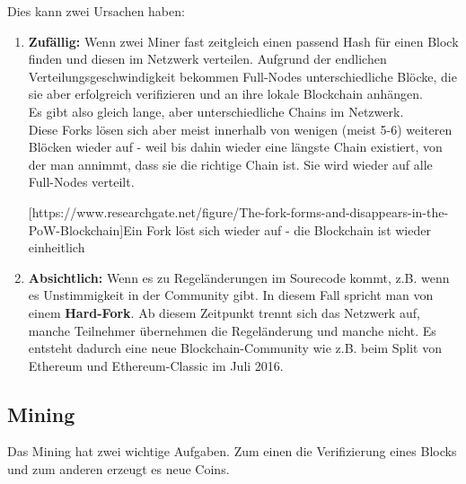 \documentclass[10pt,a4paper,titlepage]{paper}
\begin{document}
 Dies kann zwei Ursachen haben:
 \begin{enumerate}
 \item \textbf{Zufällig:} Wenn zwei Miner fast zeitgleich einen passend Hash für einen Block finden und diesen im Netzwerk verteilen. Aufgrund der endlichen Verteilungsgeschwindigkeit bekommen Full-Nodes unterschiedliche Blöcke, die sie aber erfolgreich verifizieren und an ihre lokale Blockchain anhängen.\\ Es gibt also gleich lange, aber unterschiedliche Chains im Netzwerk.\vspace{.4cm}\\
Diese Forks lösen sich aber meist innerhalb von wenigen (meist 5-6) weiteren Blöcken wieder auf - weil bis dahin wieder eine längste Chain existiert, von der man annimmt, dass sie die richtige Chain ist. Sie wird wieder auf alle Full-Nodes verteilt.
\begin{center}
[https://www.researchgate.net/figure/The-fork-forms-and-disappears-in-the-PoW-Blockchain]{Ein Fork löst sich wieder auf - die Blockchain ist wieder einheitlich}
\end{center}

\item \textbf{Absichtlich:} Wenn es zu Regeländerungen im Sourecode kommt, z.B. wenn es Unstimmigkeit in der Community gibt. In diesem Fall spricht man von einem \textbf{Hard-Fork}. Ab diesem Zeitpunkt trennt sich das Netzwerk auf, manche Teilnehmer übernehmen die Regeländerung und manche nicht. Es entsteht dadurch eine neue Blockchain-Community wie z.B. beim Split von Ethereum und Ethereum-Classic im Juli 2016.
\end{enumerate}

\subsection{Mining} \label{mining}
Das Mining hat zwei wichtige Aufgaben. Zum einen die Verifizierung eines Blocks und zum anderen erzeugt es neue Coins.
\end{document}
